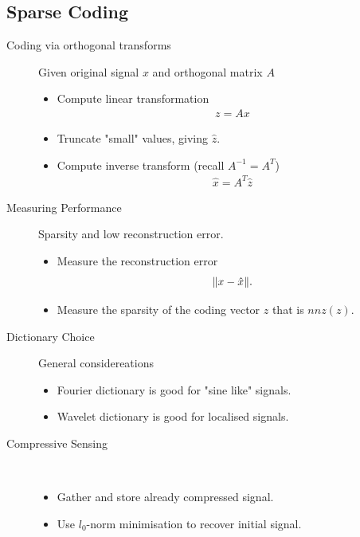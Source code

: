 \subsection{Sparse Coding}
\begin{description}
\item[Coding via orthogonal transforms] Given original signal $x$ and orthogonal matrix $A$
    \begin{itemize}
        \item Compute linear transformation
            \begin{align*}
                z = Ax
            \end{align*}
        \item Truncate "small" values, giving $\hat z$.
        \item Compute inverse transform (recall $A^{-1} = A^T$)
            \begin{align*}
                \hat x = A^T \hat z
            \end{align*}
    \end{itemize}
\item[Measuring Performance] Sparsity and low reconstruction error.
    \begin{itemize}
        \item Measure the reconstruction error 
            \begin{align*}
                \norm{x-\hat x}.
            \end{align*}
        \item Measure the sparsity of the coding vector $z$ that is $nnz(z)$.
    \end{itemize}
\item[Dictionary Choice] General considereations
    \begin{itemize}
        \item Fourier dictionary is good for "sine like" signals.
        \item Wavelet dictionary is good for localised signals.
    \end{itemize}
\item[Compressive Sensing] $\ $
    \begin{itemize}
        \item Gather and store already compressed signal.
        \item Use $l_0$-norm minimisation to recover initial signal.
    \end{itemize}

\end{description}



























